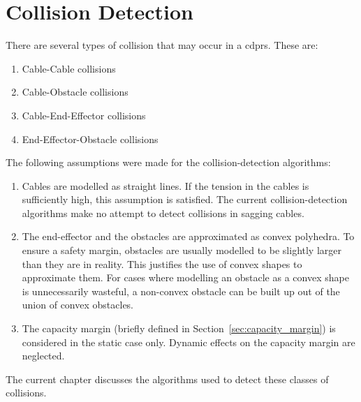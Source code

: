\chapter{Collision Detection}%
\label{chap:collision_detection}

	There are several types of collision that may occur in a \glspl{cdpr}. These
	are:

	\begin{enumerate}

		\item Cable-Cable collisions

		\item Cable-Obstacle collisions

		\item Cable-End-Effector collisions

		\item End-Effector-Obstacle collisions

	\end{enumerate}

	The following assumptions were made for the collision-detection
	algorithms:

	\begin{enumerate}

		\item

			Cables are modelled as straight lines. If the tension in the cables
			is sufficiently high, this assumption is satisfied. The current
			collision-detection algorithms make no attempt to detect collisions
			in sagging cables.

		\item

			The end-effector and the obstacles are approximated as convex
			polyhedra. To ensure a safety margin, obstacles are usually modelled
			to be slightly larger than they are in reality. This justifies the
			use of convex  shapes to approximate them. For cases where modelling
			an obstacle as a convex shape is unnecessarily wasteful, a
			non-convex obstacle can be built up out of the union of convex
			obstacles.

		\item

			The capacity
			margin (briefly defined in Section~\ref{sec:capacity_margin})
			is considered in the static case only. Dynamic effects on the
			capacity margin are neglected.

	\end{enumerate}

	The current chapter discusses the algorithms used to detect these classes of
	collisions.

	
	
	
	
	
	
